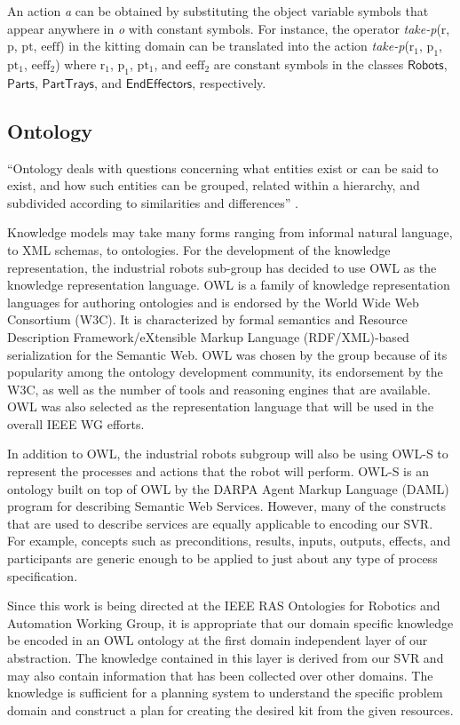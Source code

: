 \documentclass[a4paper, 10pt, conference]{ieeeconf}      %
\begin{document}
An action \textit{a} can be obtained by substituting the object variable symbols that
appear anywhere in \textit{o} with constant symbols. For instance, the operator \textsl{take-p}($\mathrm{r}$, $\mathrm{p}$, $\mathrm{pt}$, $\mathrm{eeff}$) in the kitting domain can be translated into the action \textsl{take-p}($\mathrm{r_1}$, $\mathrm{p_1}$, $\mathrm{pt_1}$, $\mathrm{eeff_2}$) where $\mathrm{r_1}$, $\mathrm{p_1}$, $\mathrm{pt_1}$, and $\mathrm{eeff_2}$ are constant symbols in the classes $\mathsf{Robots}$, $\mathsf{Parts}$, $\mathsf{PartTrays}$, and $\mathsf{EndEffectors}$, respectively.
\subsection{Ontology}
``Ontology deals with questions concerning what entities exist or can be said to exist, and how such entities can be grouped, related within a hierarchy, and subdivided according to similarities and differences'' \cite{ontologyDef}.

Knowledge models may take many forms ranging from informal natural language, to XML schemas, to ontologies.
For the development of the  knowledge representation, the industrial robots sub-group has decided to use OWL as the knowledge representation language. OWL is a family of knowledge representation languages for authoring ontologies and is endorsed by the World Wide Web Consortium (W3C). It is characterized by formal semantics and Resource Description Framework/eXtensible Markup Language (RDF/XML)-based serialization for the Semantic Web. OWL was chosen by the group because of its popularity among the ontology development community, its endorsement by the W3C, as well as the number of tools and reasoning engines that are available. OWL was also selected as the representation language that will be used in the overall IEEE WG efforts.

In addition to OWL, the industrial robots subgroup will also be using OWL-S \cite{Martin2012} to represent the processes and actions that the robot will perform. OWL-S is an ontology built on top of OWL by the DARPA Agent Markup Language (DAML) program \cite{damlWeb}
for describing Semantic Web Services. However, many of the constructs that are used to describe services are equally applicable to encoding our SVR. For example, concepts such as preconditions, results, inputs, outputs, effects, and participants are generic enough to be applied to just about any type of process specification.

Since this work is being directed at the IEEE RAS Ontologies for Robotics and Automation Working Group, it is appropriate that our  domain specific knowledge  be
encoded in an OWL ontology at the first domain independent  layer of our abstraction. The knowledge contained in this layer is derived from our SVR and may also contain
information that has been collected over other domains. The knowledge is sufficient for a planning system to understand the specific problem domain and construct
a plan for creating the desired kit from the given resources.
\end{document}
